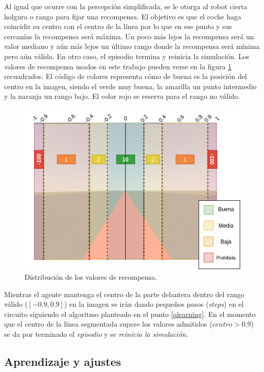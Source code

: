 Al igual que ocurre con la percepción simplificada, se le otorga al robot cierta holgura o rango para fijar una recompensa. El objetivo es que el coche haga coincidir su centro con el centro de la línea por lo que en ese punto y sus cercanías la recompensa será máxima. Un poco más lejos la recompensa será un valor mediano y aún más lejos un último rango donde la recompensa será mínima pero aún válida. En otro caso, el episodio termina y reinicia la simulación. Los valores de recompensa usados en este trabajo pueden verse en la figura \ref{fig:valores-recompensa} recuadrados. El código de colores representa cómo de buena es la posición del centro en la imagen, siendo el verde muy buena, la amarilla un punto intermedio y la naranja un rango bajo. El color rojo se reserva para el rango no válido.

\begin{figure}[!ht]
    \centering \includegraphics[width=0.7\columnwidth]{./figures/chapter_4/reward_distribution.png}
    \caption{
        \label{fig:valores-recompensa}
            Distribución de los valores de recompensa.
    }
\end{figure}

Mientras el agente mantenga el centro de la parte delantera dentro del rango válido ($[-0.9, 0.9]$) en la imagen se irán dando pequeños pasos (\textit{steps}) en el circuito siguiendo el algoritmo planteado en el punto \ref{qlearning}. En el momento que el centro de la línea segmentada supere los valores admitidos ($centro > 0.9$) se da por terminado el \textit{episodio} y se \textit{reinicia la simulación}.

\subsection{Aprendizaje y ajustes}

